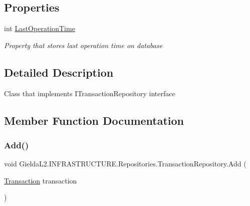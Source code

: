 \subsection*{Properties}
\begin{DoxyCompactItemize}
\item 
int \mbox{\hyperlink{class_gielda_l2_1_1_i_n_f_r_a_s_t_r_u_c_t_u_r_e_1_1_repositories_1_1_transaction_repository_aac4f791168cb10869951f5f883895ad3}{Last\+Operation\+Time}}
\begin{DoxyCompactList}\small\item\em Property that stores last operation time on database \end{DoxyCompactList}\end{DoxyCompactItemize}


\subsection{Detailed Description}
Class that implements I\+Transaction\+Repository interface 



\subsection{Member Function Documentation}
\mbox{\label{class_gielda_l2_1_1_i_n_f_r_a_s_t_r_u_c_t_u_r_e_1_1_repositories_1_1_transaction_repository_a4ec5cb8eba918ee16d2b40644877609a}} 
\subsubsection{\texorpdfstring{Add()}{Add()}}
{\footnotesize\ttfamily void Gielda\+L2.\+I\+N\+F\+R\+A\+S\+T\+R\+U\+C\+T\+U\+R\+E.\+Repositories.\+Transaction\+Repository.\+Add (\begin{DoxyParamCaption}\item[{\mbox{\hyperlink{class_gielda_l2_1_1_d_b_1_1_entities_1_1_transaction}{Transaction}}}]{transaction }\end{DoxyParamCaption})}



